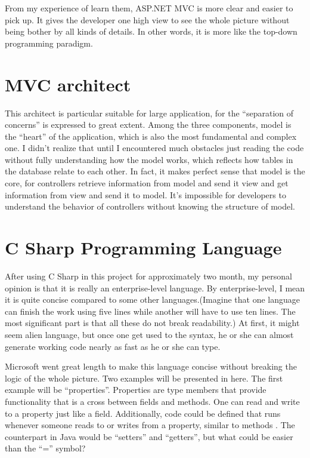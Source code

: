 From my experience of learn them, ASP.NET MVC is more clear and easier to pick up. It gives the developer one high view to see the whole picture 
without being bother by all kinds of details. In other words, it is more like the top-down programming paradigm.
\section{MVC architect}
This architect is particular suitable for large application, for the ``separation of concerns'' is expressed to great extent. Among the three 
components, model is the ``heart'' of the application, which is also the most fundamental and complex one. I didn't realize that until I encountered 
much obstacles just reading the code without fully understanding how the model works, which reflects how tables in the database relate to each other.
In fact, it makes perfect sense that model is the core, for controllers retrieve information from model and send it view and get information from 
view and send it to model. It's impossible for developers to understand the behavior of controllers without knowing the structure of model.
\section{C Sharp Programming Language}
After using C Sharp in this project for approximately two month, my personal opinion is that it is really an enterprise-level language. By 
enterprise-level, I mean it is quite concise compared to some other languages.(Imagine that one language can finish the work using five lines while 
another will have to use ten lines. The most significant part is that all these do not break readability.) At first, it might seem alien language, 
but once one get used to the syntax, he or she can almost generate working code nearly as fast as he or she can type.

Microsoft went great length to make this language concise without breaking the logic of the whole picture. Two examples will be presented in here.
The first example will be ``properties''. Properties are type members that provide functionality that is a cross between fields and methods. One can 
read and write to a property just like a field. Additionally, code could be defined that runs whenever someone reads to or writes from a property, 
similar to methods \cite{c_sharp_property}. The counterpart in Java would be ``setters'' and ``getters'', but what could be easier than the ``='' 
symbol?

